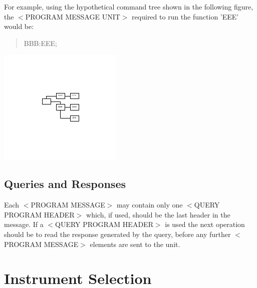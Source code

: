 For example, using the hypothetical command tree shown in the following figure, the {\ttfamily $<$}P\-R\-O\-G\-R\-A\-M M\-E\-S\-S\-A\-G\-E U\-N\-I\-T{\ttfamily $>$} required to run the function 'E\-E\-E' would be\-: \begin{quotation}
{\ttfamily B\-B\-B\-:E\-E\-E;}

\end{quotation}


\begin{center}

\begin{DoxyImageNoCaption}
  \mbox{\includegraphics[width=\textwidth,height=\textheight/2,keepaspectratio=true]{dot_inline_dotgraph_1}}
\end{DoxyImageNoCaption}
\end{center}
\hypertarget{a00001_queries}{}\subsection{Queries and Responses}\label{a00001_queries}
Each {\ttfamily $<$}P\-R\-O\-G\-R\-A\-M M\-E\-S\-S\-A\-G\-E{\ttfamily $>$} may contain only one {\ttfamily $<$}Q\-U\-E\-R\-Y P\-R\-O\-G\-R\-A\-M H\-E\-A\-D\-E\-R{\ttfamily $>$} which, if used, should be the last header in the message. If a {\ttfamily $<$}Q\-U\-E\-R\-Y P\-R\-O\-G\-R\-A\-M H\-E\-A\-D\-E\-R{\ttfamily $>$} is used the next operation should be to read the response generated by the query, before any further {\ttfamily $<$}P\-R\-O\-G\-R\-A\-M M\-E\-S\-S\-A\-G\-E{\ttfamily $>$} elements are sent to the unit.\hypertarget{a00001_device}{}\section{Instrument Selection}\label{a00001_device}
